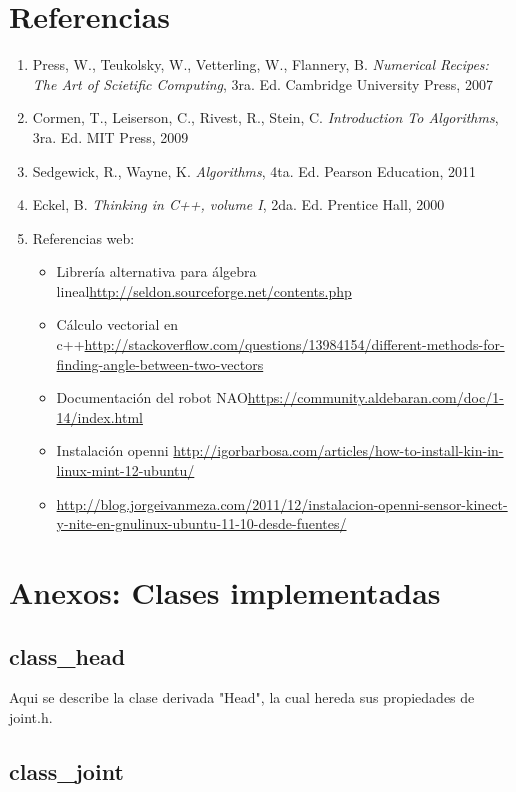\documentclass[letterpaper]{article}
\begin{document}
\section{Referencias}

\begin{enumerate}
\item Press, W., Teukolsky, W., Vetterling, W., Flannery, B. \textit{Numerical Recipes: The Art of Scietific Computing}, 3ra. Ed. Cambridge University Press, 2007
\item Cormen, T., Leiserson, C., Rivest, R., Stein, C. \textit{Introduction To Algorithms}, 3ra. Ed. MIT Press, 2009
\item Sedgewick, R., Wayne, K. \textit{Algorithms}, 4ta. Ed. Pearson Education, 2011
\item Eckel, B. \textit{Thinking in C++, volume I}, 2da. Ed. Prentice Hall, 2000
\item Referencias web: \begin{itemize}
	\item Librería alternativa para álgebra lineal\url{http://seldon.sourceforge.net/contents.php}
	\item Cálculo vectorial en c++\url{http://stackoverflow.com/questions/13984154/different-methods-for-finding-angle-between-two-vectors}
	\item Documentación del  robot NAO\url{https://community.aldebaran.com/doc/1-14/index.html}
	\item Instalación openni \url{http://igorbarbosa.com/articles/how-to-install-kin-in-linux-mint-12-ubuntu/}
	\item \url{http://blog.jorgeivanmeza.com/2011/12/instalacion-openni-sensor-kinect-y-nite-en-gnulinux-ubuntu-11-10-desde-fuentes/}
	
	\end{itemize}
\end{enumerate}
	
\section{Anexos: Clases implementadas}

\subsection{class\_head}
Aqui se describe la clase derivada "Head", la cual hereda sus propiedades de joint.h.


\subsection{class\_joint}
\end{document}
